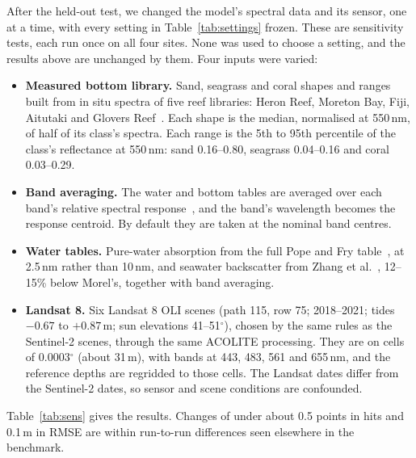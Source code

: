 \documentclass[remotesensing,article,submit,pdftex]{Definitions/mdpi}
\begin{document}
After the held-out test, we changed the model's spectral data and its sensor, one at a time, with every setting in Table~\ref{tab:settings} frozen. These are sensitivity tests, each run once on all four sites. None was used to choose a setting, and the results above are unchanged by them. Four inputs were varied:
\begin{itemize}
\item \textbf{Measured bottom library.} Sand, seagrass and coral shapes and ranges built from in situ spectra of five reef libraries: Heron Reef, Moreton Bay, Fiji, Aitutaki and Glovers Reef~\cite{roelfsema2012,roelfsema2016,roelfsema2017fiji,roelfsema2017cook,roelfsema2013}. Each shape is the median, normalised at 550\,nm, of half of its class's spectra. Each range is the 5th to 95th percentile of the class's reflectance at 550\,nm: sand 0.16--0.80, seagrass 0.04--0.16 and coral 0.03--0.29.
\item \textbf{Band averaging.} The water and bottom tables are averaged over each band's relative spectral response~\cite{esa2024srf,barsi2014}, and the band's wavelength becomes the response centroid. By default they are taken at the nominal band centres.
\item \textbf{Water tables.} Pure-water absorption from the full Pope and Fry table~\cite{pope1997}, at 2.5\,nm rather than 10\,nm, and seawater backscatter from Zhang et al.~\cite{zhang2009}, 12--15\% below Morel's, together with band averaging.
\item \textbf{Landsat 8.} Six Landsat 8 OLI scenes (path 115, row 75; 2018--2021; tides $-0.67$ to $+0.87$\,m; sun elevations 41--51$^\circ$), chosen by the same rules as the Sentinel-2 scenes, through the same ACOLITE processing. They are on cells of 0.0003$^\circ$ (about 31\,m), with bands at 443, 483, 561 and 655\,nm, and the reference depths are regridded to those cells. The Landsat dates differ from the Sentinel-2 dates, so sensor and scene conditions are confounded.
\end{itemize}

Table~\ref{tab:sens} gives the results. Changes of under about 0.5 points in hits and 0.1\,m in RMSE are within run-to-run differences seen elsewhere in the benchmark.
\end{document}
